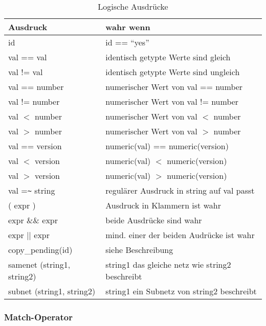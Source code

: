     \begin{table}[htb]
      \centering
      \caption{Logische Ausdrücke}
      \label{tab:expr}
      \begin{tabular}{ll}
        \hline
        Ausdruck &                     wahr wenn\\
        \hline
        \hline
       id                    &    id == "`yes"'\\
       val  == val           &    identisch getypte Werte sind gleich\\
       val  != val           &    identisch getypte Werte sind ungleich\\
       val  == number        &    numerischer Wert von val == number\\
       val  != number        &    numerischer Wert von val != number\\
       val  $<$  number      &    numerischer Wert von val $<$ number\\
       val  $>$  number      &    numerischer Wert von val $>$ number\\
       val  == version       &    numeric(val) == numeric(version) \\
       val  $<$  version     &    numeric(val) $<$  numeric(version) \\
       val  $>$  version     &    numeric(val) $>$  numeric(version) \\
       val  =\verb?~? string &    regulärer Ausdruck in string auf val passt\\
       ( expr )              &    Ausdruck in Klammern ist wahr\\
       expr \&\& expr        &    beide Ausdrücke sind wahr\\
       expr || expr          &    mind. einer der beiden Audrücke ist wahr\\
       copy\_pending(id)     &    siehe Beschreibung\\
       samenet (string1, string2) & string1 das gleiche netz wie
       string2 beschreibt\\
       subnet (string1, string2)  & string1 ein Subnetz von string2 beschreibt\\
        \hline
      \end{tabular}
    \end{table}

\subsubsection{Match-Operator}

